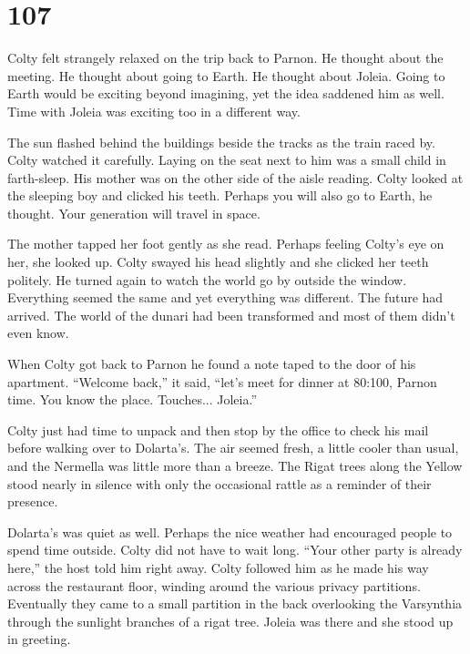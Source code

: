 
\chapter{107}

Colty felt strangely relaxed on the trip back to Parnon. He thought about the meeting. He
thought about going to Earth. He thought about Joleia. Going to Earth would be exciting beyond
imagining, yet the idea saddened him as well. Time with Joleia was exciting too in a different
way.

The sun flashed behind the buildings beside the tracks as the train raced by. Colty watched it
carefully. Laying on the seat next to him was a small child in farth-sleep. His mother was on
the other side of the aisle reading. Colty looked at the sleeping boy and clicked his teeth.
Perhaps you will also go to Earth, he thought. Your generation will travel in space.

The mother tapped her foot gently as she read. Perhaps feeling Colty's eye on her, she looked
up. Colty swayed his head slightly and she clicked her teeth politely. He turned again to watch
the world go by outside the window. Everything seemed the same and yet everything was different.
The future had arrived. The world of the dunari had been transformed and most of them didn't
even know.

When Colty got back to Parnon he found a note taped to the door of his apartment. ``Welcome
back,'' it said, ``let's meet for dinner at 80:100, Parnon time. You know the place. Touches...
Joleia.''

Colty just had time to unpack and then stop by the office to check his mail before walking over
to Dolarta's. The air seemed fresh, a little cooler than usual, and the Nermella was little more
than a breeze. The Rigat trees along the Yellow stood nearly in silence with only the occasional
rattle as a reminder of their presence.

Dolarta's was quiet as well. Perhaps the nice weather had encouraged people to spend time
outside. Colty did not have to wait long. ``Your other party is already here,'' the host told
him right away. Colty followed him as he made his way across the restaurant floor, winding
around the various privacy partitions. Eventually they came to a small partition in the back
overlooking the Varsynthia through the sunlight branches of a rigat tree. Joleia was there and
she stood up in greeting.

